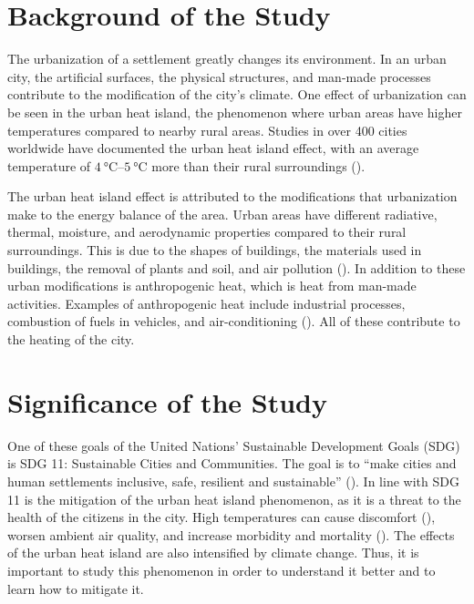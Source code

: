 \section{Background of the Study}
	The urbanization of a settlement greatly changes its environment.
	In an urban city, the artificial surfaces, the physical structures, and man-made processes contribute to the modification of the city's climate.
	One effect of urbanization can be seen in the urban heat island, the phenomenon where urban areas have higher temperatures compared to nearby rural areas.
	Studies in over 400 cities worldwide have documented the urban heat island effect,
		with an average temperature of $\qtyrange{4}{5}{\degreeCelsius}$ more than their rural surroundings (\cite{Santamouris2020}).
	
	The urban heat island effect is attributed to the modifications that urbanization make to the energy balance of the area.
	Urban areas have different radiative, thermal, moisture, and aerodynamic properties compared to their rural surroundings.
	This is due to the shapes of buildings, the materials used in buildings, the removal of plants and soil, and air pollution (\cite{Stewart2012}).
	In addition to these urban modifications is anthropogenic heat, which is heat from man-made activities.
	Examples of anthropogenic heat include industrial processes, combustion of fuels in vehicles, and air-conditioning (\cite{Oke2017urban}).
	All of these contribute to the heating of the city.
	
\section{Significance of the Study}
	One of these goals of the United Nations' Sustainable Development Goals (SDG) is SDG 11: Sustainable Cities and Communities.
	The goal is to ``make cities and human settlements inclusive, safe, resilient and sustainable'' (\cite{UN2015}).
	In line with SDG 11 is the mitigation of the urban heat island phenomenon, as it is a threat to the health of the citizens in the city.
	High temperatures can cause discomfort (\cite{Bhati2018}), worsen ambient air quality, and increase morbidity and mortality (\cite {Khan2021}).
	The effects of the urban heat island are also intensified by climate change.
	Thus, it is important to study this phenomenon in order to understand it better and to learn how to mitigate it.	

